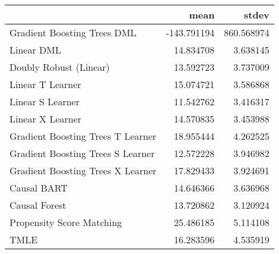 \begin{tabular}{lrr}
\toprule
{} &        mean &       stdev \\
\midrule
Gradient Boosting Trees DML       & -143.791194 &  860.568974 \\
Linear DML                        &   14.834708 &    3.638145 \\
Doubly Robust (Linear)            &   13.592723 &    3.737009 \\
Linear T Learner                  &   15.074721 &    3.586868 \\
Linear S Learner                  &   11.542762 &    3.416317 \\
Linear X Learner                  &   14.570835 &    3.453988 \\
Gradient Boosting Trees T Learner &   18.955444 &    4.262525 \\
Gradient Boosting Trees S Learner &   12.572228 &    3.946982 \\
Gradient Boosting Trees X Learner &   17.829433 &    3.924691 \\
Causal BART                       &   14.646366 &    3.636968 \\
Causal Forest                     &   13.720862 &    3.120924 \\
Propensity Score Matching         &   25.486185 &    5.114108 \\
TMLE                              &   16.283596 &    4.535919 \\
\bottomrule
\end{tabular}
